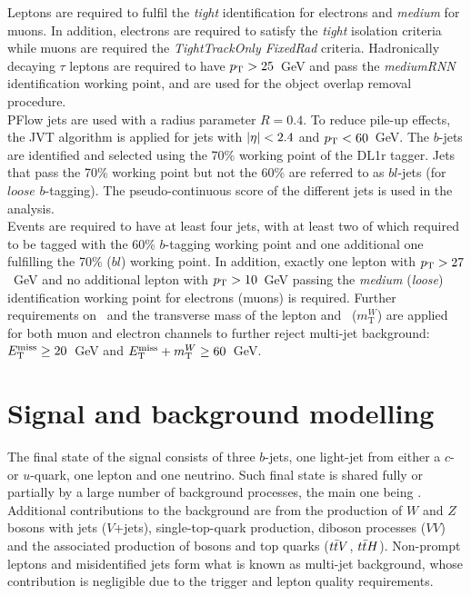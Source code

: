 Leptons are required to fulfil the \textit{tight} identification for electrons and \textit{medium} for muons. In addition, electrons are required to satisfy the \textit{tight} isolation criteria while muons are required the \textit{TightTrackOnly FixedRad} criteria. Hadronically decaying $\tau$ leptons are required to have $p_{\text{T}}>25$~GeV and pass the \textit{mediumRNN} identification working point, and are used for the object overlap removal procedure.\\

PFlow jets are used with a radius parameter $R=0.4$. To reduce pile-up effects, the JVT algorithm is applied for jets with $\abs{\eta}<2.4$ and $p_{\text{T}}<60$~GeV. The $b$-jets are identified and selected using the 70\% working point of the DL1r tagger. Jets that pass the 70\% working point but not the 60\% are referred to as $bl$-jets (for $loose$ $b$-tagging). The pseudo-continuous score of the different jets is used in the analysis.\\

Events are required to have at least four jets, with at least two of which required to be tagged with the 60\% $b$-tagging working point and one additional one fulfilling the 70\% ($bl$) working point. In addition, exactly one lepton with $p_{\text{T}}>27$~GeV and no additional lepton with $p_{\text{T}}>10$~GeV passing the \textit{medium} (\textit{loose}) identification working point for electrons (muons) is required. Further requirements on \MET\ and the transverse mass of the lepton and \MET\ ($m_{\text{T}}^W$) are applied for both muon and electron channels to further reject multi-jet background: $E_{\text{T}}^{\text{miss}}\geq20$~GeV and $E_{\text{T}}^{\text{miss}}+m_{\text{T}}^W\geq60$~GeV.\\

\section{Signal and background modelling}

The final state of the signal consists of three $b$-jets, one light-jet from either a $c$- or $u$-quark, one lepton and one neutrino. Such final state is shared fully or partially by a large number of background processes, the main one being \ttjets. Additional contributions to the background are from the production of $W$ and $Z$ bosons with jets ($V$+jets), single-top-quark production, diboson processes ($VV$) and the associated production of bosons and top quarks ($t\bar{t} V$, $t\bar{t} H$). Non-prompt leptons and misidentified jets form what is known as multi-jet background, whose contribution is negligible due to the trigger and lepton quality requirements.\\

